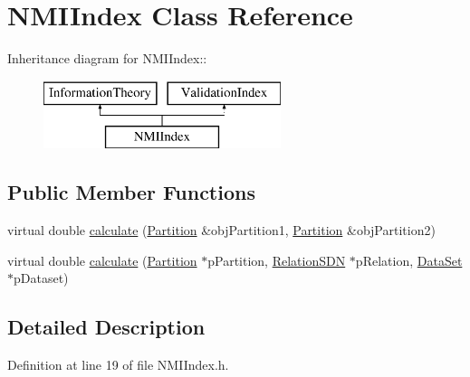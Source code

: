 \hypertarget{classNMIIndex}{
\section{NMIIndex Class Reference}
\label{classNMIIndex}
}
Inheritance diagram for NMIIndex::\begin{figure}[H]
\begin{center}
\leavevmode
\includegraphics[height=2cm]{classNMIIndex}
\end{center}
\end{figure}
\subsection*{Public Member Functions}
\begin{DoxyCompactItemize}
\item 
virtual double \hyperlink{classNMIIndex_a3d2c254720bd825119d1cd7905daa50f}{calculate} (\hyperlink{classPartition}{Partition} \&objPartition1, \hyperlink{classPartition}{Partition} \&objPartition2)
\item 
virtual double \hyperlink{classNMIIndex_a930fb32a05cbba0f427510536c204694}{calculate} (\hyperlink{classPartition}{Partition} $\ast$pPartition, \hyperlink{classRelationSDN}{RelationSDN} $\ast$pRelation, \hyperlink{classDataSet}{DataSet} $\ast$pDataset)
\end{DoxyCompactItemize}


\subsection{Detailed Description}


Definition at line 19 of file NMIIndex.h.

